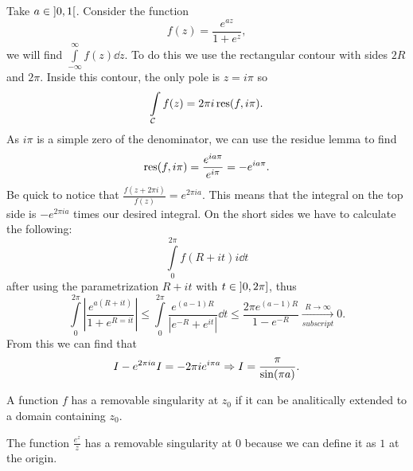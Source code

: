 \documentclass[12pt]{memoir}
\begin{document}
\begin{Ex}
    Take $a\in\left\rbrack0,1\right\lbrack$. Consider the function 
    $$f(z)=\frac{e^{az}}{1+e^z},$$
    we will find $\int\limits_{-\infty}^\infty f(z)\dd z$. To do this we use the rectangular contour with sides $2R$ and $2\pi$. Inside this contour, the only pole is $z=i\pi$ so 
    $$\int\limits_{\mathcal{C}}f(z)=2\pi i\operatorname*{res}(f,i\pi).$$
    As $i\pi$ is a simple zero of the denominator, we can use the residue lemma to find 
    $$\operatorname*{res}(f,i\pi)=\frac{e^{ia\pi}}{e^{i\pi}}=-e^{ia\pi}.$$
    Be quick to notice that $\frac{f(z+2\pi i)}{f(z)}=e^{2\pi i a}$. This means that the integral on the top side is $-e^{2\pi i a}$ times our desired integral. On the short sides we have to calculate the following:
    $$\int\limits_0^{2\pi}f(R+it)i\dd t$$
    after using the parametrization $R+it$ with $t\in\left\rbrack0,2\pi\right\rbrack$, thus 
    $$\int\limits_0^{2\pi}\left|\frac{e^{a(R+it)}}{1+e^{R=it}}\right|\leq\int\limits_0^{2\pi}\frac{e^{(a-1)R}}{|e^{-R}+e^{it}|}\dd t\leq\frac{2\pi e^{(a-1)R}}{1-e^{-R}}\xrightarrow[subscript]{R\to\infty
    }0.$$
    From this we can find that 
    $$I-e^{2\pi ia}I=-2\pi i e^{i\pi a}\Rightarrow I=\frac{\pi}{\sin(\pi a)}.$$
\end{Ex}

\begin{Def}
    A function $f$ has a removable singularity at $z_0$ if it can be analitically extended to a domain containing $z_0$.
\end{Def}

\begin{Ex}
    The function $\frac{e^z}{z}$ has a removable singularity at 0 because we can define it as $1$ at the origin.
\end{Ex}
\ifx\nextra\undefined
\printindex
\else\fi
\nocite{*}


\end{document}
